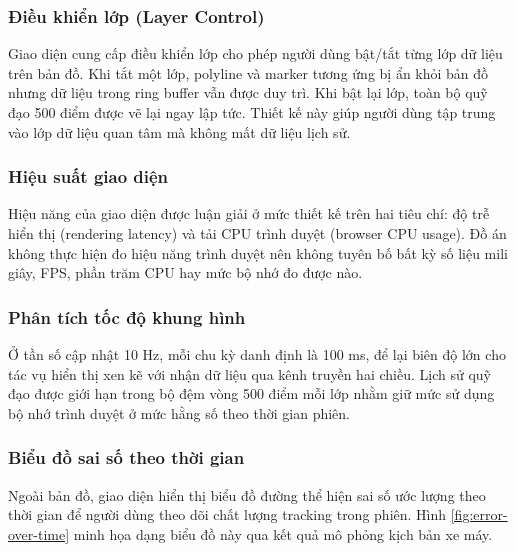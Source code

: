 \subsubsection{Điều khiển lớp (Layer Control)}

\hspace{0.5cm} Giao diện cung cấp điều khiển lớp cho phép người dùng bật/tắt từng lớp dữ liệu trên bản đồ. Khi tắt một lớp, polyline và marker tương ứng bị ẩn khỏi bản đồ nhưng dữ liệu trong ring buffer vẫn được duy trì. Khi bật lại lớp, toàn bộ quỹ đạo 500 điểm được vẽ lại ngay lập tức. Thiết kế này giúp người dùng tập trung vào lớp dữ liệu quan tâm mà không mất dữ liệu lịch sử.

\subsubsection{Hiệu suất giao diện}

\hspace{0.5cm} Hiệu năng của giao diện được luận giải ở mức thiết kế trên hai tiêu chí: độ trễ hiển thị (rendering latency) và tải CPU trình duyệt (browser CPU usage). Đồ án không thực hiện đo hiệu năng trình duyệt nên không tuyên bố bất kỳ số liệu mili giây, FPS, phần trăm CPU hay mức bộ nhớ đo được nào.

\subsubsection{Phân tích tốc độ khung hình}

\hspace{0.5cm} Ở tần số cập nhật 10 Hz, mỗi chu kỳ danh định là 100 ms, để lại biên độ lớn cho tác vụ hiển thị xen kẽ với nhận dữ liệu qua kênh truyền hai chiều. Lịch sử quỹ đạo được giới hạn trong bộ đệm vòng 500 điểm mỗi lớp nhằm giữ mức sử dụng bộ nhớ trình duyệt ở mức hằng số theo thời gian phiên.

\subsubsection{Biểu đồ sai số theo thời gian}

\hspace{0.5cm} Ngoài bản đồ, giao diện hiển thị biểu đồ đường thể hiện sai số ước lượng theo thời gian để người dùng theo dõi chất lượng tracking trong phiên. Hình \ref{fig:error-over-time} minh họa dạng biểu đồ này qua kết quả mô phỏng kịch bản xe máy.

